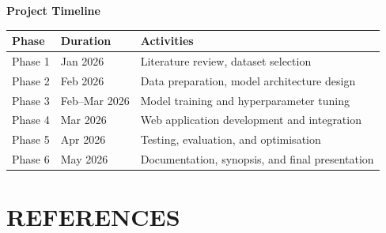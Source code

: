 \documentclass[12pt,a4paper]{article}
\begin{document}
\vspace{0.5cm}
\textbf{Project Timeline}
\vspace{0.3cm}

\begin{tabularx}{\textwidth}{l l X}
\toprule
\textbf{Phase} & \textbf{Duration} & \textbf{Activities} \\
\midrule
Phase 1 & Jan 2026 & Literature review, dataset selection \\
\rowcolor{gray!10}
Phase 2 & Feb 2026 & Data preparation, model architecture design \\
Phase 3 & Feb--Mar 2026 & Model training and hyperparameter tuning \\
\rowcolor{gray!10}
Phase 4 & Mar 2026 & Web application development and integration \\
Phase 5 & Apr 2026 & Testing, evaluation, and optimisation \\
\rowcolor{gray!10}
Phase 6 & May 2026 & Documentation, synopsis, and final presentation \\
\bottomrule
\end{tabularx}


\newpage
\section{REFERENCES}
\end{document}
